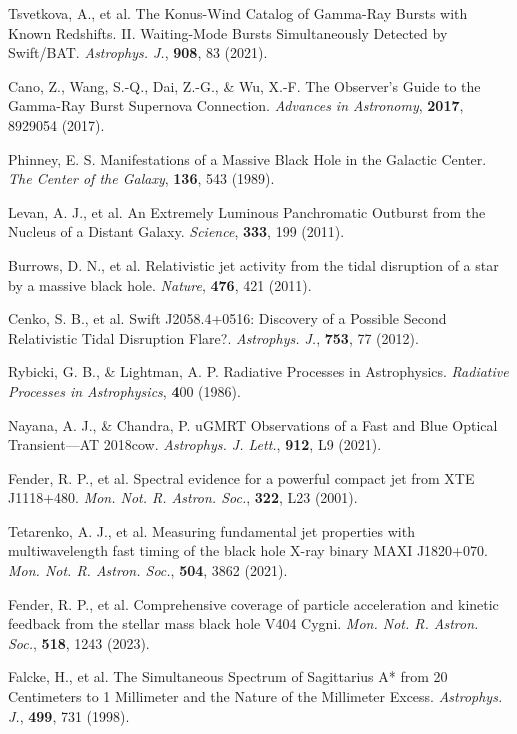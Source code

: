 \documentclass{nature_plusfigure}
\newcommand{\mn}{{Mon. Not. R. Astron. Soc.}}
\newcommand{\mnras}{\mn}
\newcommand{\apj}{{Astrophys. J.}}
\newcommand{\apjl}{{Astrophys. J. Lett.}}
\newcommand{\nat}{{Nature}}
\begin{document}
\begin{methods}
\begin{thebibliography}{10}

 Tsvetkova, A., et al. The Konus-Wind Catalog of Gamma-Ray Bursts with Known Redshifts. II. Waiting-Mode Bursts Simultaneously Detected by Swift/BAT. \emph{\apj}, \textbf{908}, 83 (2021). 

 Cano, Z., Wang, S.-Q., Dai, Z.-G., \& Wu, X.-F. The Observer's Guide to the Gamma-Ray Burst Supernova Connection. \emph{Advances in Astronomy}, \textbf{2017}, 8929054 (2017). 
 
 
  Phinney, E. S. Manifestations of a Massive Black Hole in the Galactic Center. \emph{The Center of the Galaxy}, \textbf{136}, 543 (1989). 
 
  Levan, A. J., et al. An Extremely Luminous Panchromatic Outburst from the Nucleus of a Distant Galaxy. \emph{Science}, \textbf{333}, 199 (2011). 

  Burrows, D. N., et al. Relativistic jet activity from the tidal disruption of a star by a massive black hole. \emph{\nat}, \textbf{476}, 421 (2011). 

 Cenko, S. B., et al. Swift J2058.4+0516: Discovery of a Possible Second Relativistic Tidal Disruption Flare?. \emph{\apj}, \textbf{753}, 77 (2012). 


 Rybicki, G. B., \& Lightman, A. P. Radiative Processes in Astrophysics. \emph{Radiative Processes in Astrophysics}, \textbf 400 (1986). 

 Nayana, A. J., \& Chandra, P. uGMRT Observations of a Fast and Blue Optical Transient—AT 2018cow. \emph{\apjl}, \textbf{912}, L9 (2021). 

 Fender, R. P., et al. Spectral evidence for a powerful compact jet from XTE J1118+480. \emph{\mnras}, \textbf{322}, L23 (2001).

 Tetarenko, A. J., et al. Measuring fundamental jet properties with multiwavelength fast timing of the black hole X-ray binary MAXI J1820+070. \emph{\mnras}, \textbf{504}, 3862 (2021).  

  Fender, R. P., et al. Comprehensive coverage of particle acceleration and kinetic feedback from the stellar mass black hole V404 Cygni. \emph{\mnras}, \textbf{518}, 1243 (2023). 
 
  Falcke, H., et al. The Simultaneous Spectrum of Sagittarius A* from 20 Centimeters to 1 Millimeter and the Nature of the Millimeter Excess. \emph{\apj}, \textbf{499}, 731 (1998). 


\end{thebibliography}
\end{methods}
\end{document}
